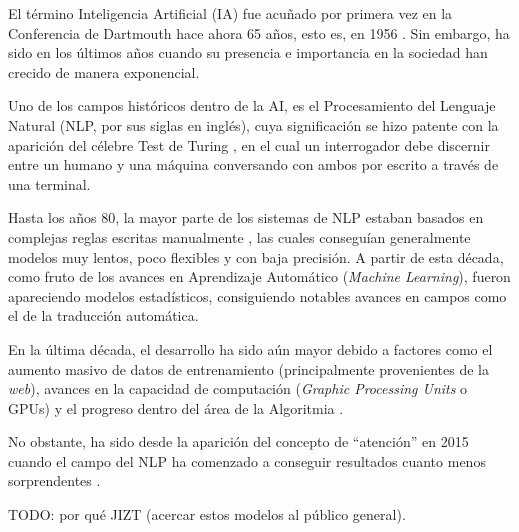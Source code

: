 
El término Inteligencia Artificial (IA) fue acuñado por primera vez en la Conferencia de Dartmouth hace ahora 65 años, esto es, en 1956 \cite{crevier95}. Sin embargo, ha sido en los últimos años cuando su presencia e importancia en la sociedad han crecido de manera exponencial.

Uno de los campos históricos dentro de la AI, es el Procesamiento del Lenguaje Natural (NLP, por sus siglas en inglés), cuya significación se hizo patente con la aparición del célebre Test de Turing \cite{turing50}, en el cual un interrogador debe discernir entre un humano y una máquina conversando con ambos por escrito a través de una terminal.

Hasta los años 80, la mayor parte de los sistemas de NLP estaban basados en complejas reglas escritas manualmente \cite{mccorduck79}, las cuales conseguían generalmente modelos muy lentos, poco flexibles y con baja precisión. A partir de esta década, como fruto de los avances en Aprendizaje Automático (\emph{Machine Learning}), fueron apareciendo modelos estadísticos, consiguiendo notables avances en campos como el de la traducción automática.

En la última década, el desarrollo ha sido aún mayor debido a factores como el aumento masivo de datos de entrenamiento (principalmente provenientes de la \emph{web}), avances en la capacidad de computación (\emph{Graphic Processing Units} o GPUs) y el progreso dentro del área de la Algoritmia \cite{rahmfeld19}.

No obstante, ha sido desde la aparición del concepto de ``atención'' en 2015 \cite{luong15, bahdanau16} cuando el campo del NLP ha comenzado a conseguir resultados cuanto menos sorprendentes \cite{macaulay20, wiggers21}.

TODO: por qué JIZT (acercar estos modelos al público general).